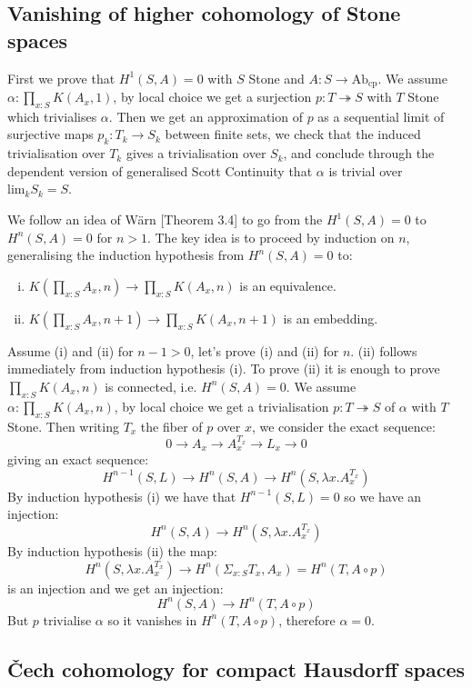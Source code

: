 \documentclass{../util/zariski}
\begin{document}
\subsection*{Vanishing of higher cohomology of Stone spaces}

First we prove that $H^1(S,A) = 0$ with $S$ Stone and  $A : S\to \mathrm{Ab}_{\mathrm{cp}}$. We assume $\alpha:\prod_{x:S}K(A_x,1)$, by local choice we get a surjection $p:T\twoheadrightarrow S$ with $T$ Stone which trivialises $\alpha$. Then we get an approximation of $p$ as a sequential limit of surjective maps $p_k:T_k\to S_k$ between finite sets, we check that the induced trivialisation over $T_k$ gives a trivialisation over $S_k$, and conclude through the dependent version of generalised Scott Continuity that $\alpha$ is trivial over $\mathrm{lim}_kS_k =S$.

We follow an idea of Wärn \cite{cech-draft}[Theorem 3.4] to go from the $H^1(S,A)=0$ to $H^n(S,A)=0$ for $n>1$. The key idea is to proceed by induction on $n$, generalising the induction hypothesis from $H^n(S,A) = 0$ to: 
\begin{enumerate}[(i)]
\item $K(\prod_{x:S}A_x,n) \to \prod_{x:S}K(A_x,n)$ is an equivalence.
\item $K(\prod_{x:S}A_x,n+1) \to \prod_{x:S}K(A_x,n+1)$ is an embedding.
\end{enumerate}
Assume (i) and (ii) for $n-1>0$, let's prove (i) and (ii) for $n$. (ii) follows immediately from induction hypothesis (i). To prove (ii) it is enough to prove $\prod_{x:S}K(A_x,n)$ is connected, i.e. $H^n(S,A)=0$. We assume $\alpha:\prod_{x:S}K(A_x,n)$, by local choice we get a trivialisation $p:T\twoheadrightarrow S$ of $\alpha$ with $T$ Stone. Then writing $T_x$ the fiber of $p$ over $x$, we consider the exact sequence:
\[0\to A_x\to A_x^{T_x}\to L_x\to 0\]
giving an exact sequence:
\[H^{n-1}(S,L)\to H^n(S,A)\to H^n(S,\lambda x. A_x^{T_x})\]
By induction hypothesis (i) we have that $H^{n-1}(S,L) = 0$ so we have an injection:
\[H^n(S,A)\to H^n(S,\lambda x. A_x^{T_x})\]
By induction hypothesis (ii) the map: 
\[H^n(S,\lambda x. A_x^{T_x}) \to H^n(\Sigma_{x:S}T_x,A_x) = H^n(T,A\circ p)\]
is an injection and we get an injection:
\[H^n(S,A)\to H^n(T,A\circ p)\] 
But $p$ trivialise $\alpha$ so it vanishes in $H^n(T,A\circ p)$, therefore $\alpha=0$.

\subsection*{\v{C}ech cohomology for compact Hausdorff spaces}
\end{document}
